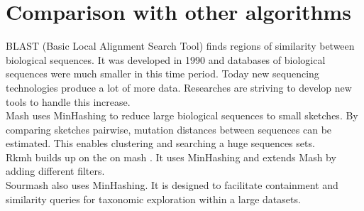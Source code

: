 \section{Comparison with other algorithms}


BLAST (Basic Local Alignment Search Tool) \cite{blast} finds regions of similarity between biological sequences. It was developed in 1990 and databases of biological sequences were much smaller in this time period. Today new sequencing technologies produce a lot of more data. Researches are striving to develop new tools to handle this increase.\\

Mash \cite{mash} uses MinHashing to reduce large biological sequences to small sketches. By comparing sketches pairwise, mutation distances between sequences can be estimated. This enables clustering and searching a huge sequences sets.\\

Rkmh builds up on the on mash \cite{mash}. It uses MinHashing and extends Mash by adding different filters.\\

Sourmash \cite{sourmash} also uses MinHashing. It is designed to facilitate containment and similarity queries for taxonomic exploration within a large datasets.\\\
